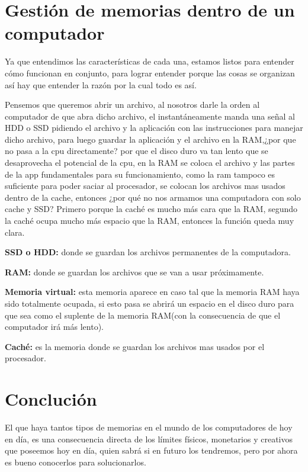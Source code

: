 \documentclass{article}
\begin{document}
\section{Gestión de memorias dentro de un computador}
\vspace{1cm}

Ya que entendimos las características de cada una, estamos listos para entender cómo funcionan en conjunto, para lograr entender porque las cosas se organizan así hay que entender la razón por la cual todo es así.
\vspace{0.4cm}

Pensemos que queremos abrir un archivo, al nosotros darle la orden al computador de que abra dicho archivo, el instantáneamente manda una señal al HDD o SSD pidiendo el archivo y la aplicación con las instrucciones para manejar dicho archivo, para luego guardar la aplicación y el archivo en la RAM,¿por que no pasa a la cpu directamente? por que el disco duro va tan lento que se desaprovecha el potencial de la cpu, en la RAM se coloca el archivo y las partes de la app fundamentales para su funcionamiento, como la ram tampoco es suficiente para poder saciar al procesador, se colocan los archivos mas usados dentro de la cache, entonces ¿por qué no nos armamos una computadora con solo cache y SSD? Primero porque la caché es mucho más cara que la RAM, segundo la caché ocupa mucho más espacio que la RAM, entonces la función queda muy clara.\cite{pdfu}
\vspace{0.4cm}

\textbf{SSD o HDD:} donde se guardan los archivos permanentes de la 
computadora.
\vspace{0.4cm}

\textbf{RAM:} donde se guardan los archivos que se van a usar próximamente.
\vspace{0.4cm}

\textbf{Memoria virtual:} esta memoria aparece en caso tal que la memoria RAM haya sido totalmente ocupada, si esto pasa se abrirá un espacio en el disco duro para que sea como el suplente de la memoria RAM(con la consecuencia de que el computador irá más lento).
\vspace{0.4cm}

\textbf{Caché:} es la memoria donde se guardan los archivos mas usados por el procesador. 
\vspace{3cm}
\newpage
\section{Conclución}
\vspace{1cm}
El que haya tantos tipos de memorias en el mundo de los computadores de hoy en día, es una consecuencia directa de los límites físicos, monetarios y creativos que poseemos hoy en día, quien sabrá si en futuro los tendremos, pero por ahora es bueno conocerlos para solucionarlos.
\vspace{3cm}





\end{document}

